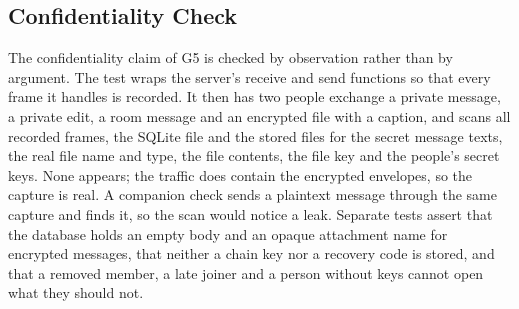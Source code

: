 \documentclass[conference]{IEEEtran}
\begin{document}
\subsection{Confidentiality Check}
The confidentiality claim of G5 is checked by observation rather than by argument. The test wraps the server's receive and send functions so that every frame it handles is recorded. It then has two people exchange a private message, a private edit, a room message and an encrypted file with a caption, and scans all recorded frames, the SQLite file and the stored files for the secret message texts, the real file name and type, the file contents, the file key and the people's secret keys. None appears; the traffic does contain the encrypted envelopes, so the capture is real. A companion check sends a plaintext message through the same capture and finds it, so the scan would notice a leak. Separate tests assert that the database holds an empty body and an opaque attachment name for encrypted messages, that neither a chain key nor a recovery code is stored, and that a removed member, a late joiner and a person without keys cannot open what they should not.
\end{document}
